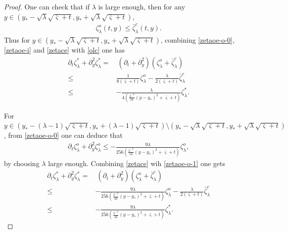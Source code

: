 \documentclass{amsart}
\numberwithin{equation}{section}
\begin{document}
\begin{proof}
One can check that if $\lambda$ is large enough, then for any $y\in\left(y_{*}-\sqrt{\lambda}\sqrt{\bar{\varsigma}+t},y_{*}+\sqrt{\lambda}\sqrt{\bar{\varsigma}+t}\right)$,
\begin{align}\label{olc}
\zeta_{\lambda}^{o}(t,y)\leq\bar{\zeta}_{\lambda}^{c}(t,y).
\end{align}
Thus for $y\in\left(y_{*}-\sqrt{\lambda}\sqrt{\bar{\varsigma}+t},y_{*}+\sqrt{\lambda}\sqrt{\bar{\varsigma}+t}\right)$,
combining \eqref{zetaoe-o-0}, \eqref{zetaoe-i} and \eqref{zetace} with \eqref{olc} one has
\begin{align}\label{zeta*1}
\partial_{t}\zeta_{\lambda}^{*}+\partial_{y}^{2}\zeta_{\lambda}^{*}
=&~\left(\partial_{t}+\partial_{y}^{2}\right)(\zeta_{\lambda}^{o}+\bar{\zeta}_{\lambda}^{c})\\
\leq& \frac{1}{8(\bar{\varsigma}+t)}\zeta_{\lambda}^{o}-\frac{\lambda}{2(\bar{\varsigma}+t)}\bar{\zeta}_{\lambda}^{c}\nonumber\\
\leq& -\frac{\lambda}{4(\frac{\lambda^{-2}}{16}(y-y_{*})^{2}+\bar{\varsigma}+t)}\zeta_{\lambda}^{*}.\nonumber
\end{align}

For $y\in\left(y_{*}-(\lambda-1)\sqrt{\bar{\varsigma}+t},y_{*}+(\lambda-1)\sqrt{\bar{\varsigma}+t}\right)\setminus(y_{*}-\sqrt{\lambda}\sqrt{\bar{\varsigma}+t},y_{*}+\sqrt{\lambda}\sqrt{\bar{\varsigma}+t})$,
from \eqref{zetaoe-o-0} one can deduce that
\begin{align}\label{zetaoe-o-1}
\partial_{t}\zeta_{\lambda}^{o}+\partial_{y}^{2}\zeta_{\lambda}^{o}
\leq -\frac{9\lambda}{256(\frac{\lambda^{-2}}{16}(y-y_{*})^{2}+\bar{\varsigma}+t)}\zeta_{\lambda}^{o},
\end{align}
by choosing $\lambda$ large enough. Combining \eqref{zetace} wih \eqref{zetaoe-o-1} one gets
\begin{align}\label{zeta*2}
\partial_{t}\zeta_{\lambda}^{*}+\partial_{y}^{2}\zeta_{\lambda}^{*}
=&~\left(\partial_{t}+\partial_{y}^{2}\right)(\zeta_{\lambda}^{o}+\bar{\zeta}_{\lambda}^{c})\\
\leq& -\frac{9\lambda}{256(\frac{\lambda^{-2}}{16}(y-y_{*})^{2}+\bar{\varsigma}+t)}\zeta_{\lambda}^{o}
      -\frac{\lambda}{2(\bar{\varsigma}+t)}\bar{\zeta}_{\lambda}^{c}\nonumber\\
\leq& -\frac{9\lambda}{256(\frac{\lambda^{-2}}{16}(y-y_{*})^{2}+\bar{\varsigma}+t)}\zeta_{\lambda}^{*}.\nonumber
\end{align}


\end{proof}
\end{document}
